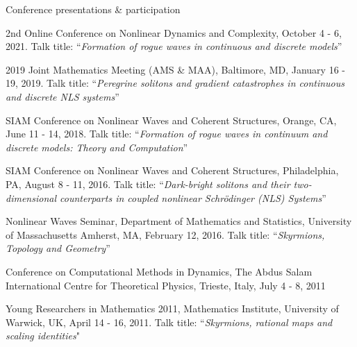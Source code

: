 \documentclass[10pt]{article} %
\newenvironment{innerlist}[1][\enskip\textbullet]%
        {\begin{compactitem}[#1]}{\end{compactitem}}
\begin{document}
\begin{section}{Conference presentations \& participation}
\begin{innerlist}
\setlength\itemsep{1em}


\item \vskip -4.3mm  2nd Online Conference on Nonlinear Dynamics and Complexity, October 4 - 6, 2021.
Talk title: ``\textit{Formation of rogue waves in continuous and discrete models}''
                         
\item
2019 Joint Mathematics Meeting (AMS \& MAA), Baltimore, MD, January 16 - 19, 2019.  
                         Talk title: ``\textit{Peregrine solitons and gradient catastrophes in continuous
                         and discrete NLS systems}''

\item SIAM Conference on Nonlinear Waves and Coherent Structures, Orange, CA, June 11 - 14, 2018.
      Talk title: ``\textit{Formation of rogue waves in continuum and discrete models: Theory and
      Computation}''

\item  SIAM Conference on Nonlinear Waves and Coherent Structures, Philadelphia, PA, August 8 - 11, 2016.
       Talk title: ``\textit{Dark-bright solitons and their two-dimensional counterparts in coupled nonlinear 
       Schr\"odinger (NLS) Systems}''

\item Nonlinear Waves Seminar, Department of Mathematics and Statistics, University of Massachusetts Amherst, 
      MA, February 12, 2016.
      Talk title: ``\textit{Skyrmions, Topology and Geometry}''

\item  Conference on Computational Methods in Dynamics, The Abdus Salam International Centre for
       Theoretical Physics, Trieste, Italy, July 4 - 8, 2011

\item  Young Researchers in Mathematics 2011, Mathematics Institute, University of Warwick, UK, April 14 - 16, 2011.
       Talk title: ``\textit{Skyrmions, rational maps and scaling identities}"
 

\end{innerlist}
\end{section}
\end{document}
